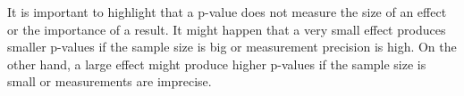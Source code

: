 It is important to highlight that a p-value does not measure the size of an effect or the importance of a result.
It might happen that a very small effect produces smaller p-values if the
sample size is big or measurement precision is high.
On the other hand, a large effect might produce higher p-values if
the sample size is small or measurements are imprecise.







